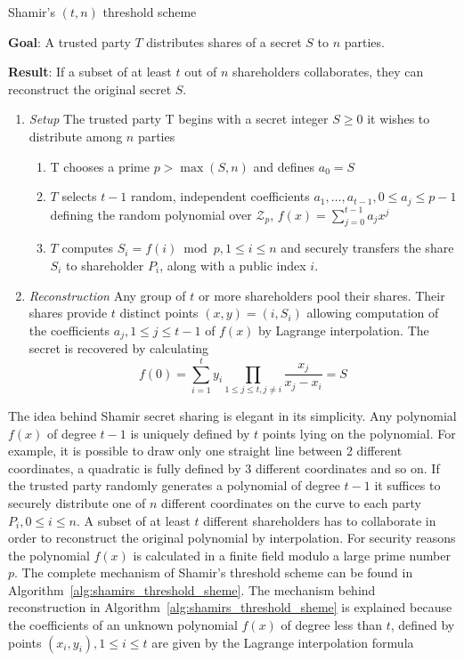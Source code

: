 \begin{algorithm}
\caption{Shamir's $\left( t, n \right)$ threshold scheme~\cite{book:handbook_of_applied_cryptography} }
\label{alg:shamirs_threshold_sheme}
 \textbf{Goal}: A trusted party $T$ distributes shares of a secret $S$ to $n$ parties.
 
 \textbf{Result}: If a subset of at least $t$ out of $n$ shareholders collaborates, they can reconstruct the original secret $S$.
 \begin{enumerate}
  \item \textit{Setup} The trusted party T begins with a secret integer $S \geq 0$ it wishes to distribute among $n$ parties
   \begin{enumerate}
    \item T chooses a prime $p > \max \left( S, n \right)$ and defines $a_0 = S$
    \item $T$ selects $t-1$ random, independent coefficients $a_1, \ldots, a_{t-1}, 0 \leq a_j \leq p-1$ defining the random polynomial over $\mathcal{Z}_p$, $f \left( x \right) = \sum^{t-1}_{j=0} a_j x^j$
    \item $T$ computes $S_i = f \left( i \right) \bmod p, 1 \leq i \leq n$ and securely transfers the share $S_i$ to shareholder $P_i$, along with a public index $i$.
   \end{enumerate}
   \item \textit{Reconstruction} Any group of $t$ or more shareholders pool their shares. Their shares provide $t$ distinct points $\left( x, y \right) = \left( i, S_i \right)$ allowing computation of the coefficients $a_j, 1 \leq j \leq t-1$ of $f \left( x \right)$ by Lagrange interpolation. The secret is recovered by calculating
 \begin{equation*}
  f \left( 0 \right) = \sum^t_{i=1}y_i \prod_{1 \leq j \leq t, j \neq i} \frac{x_j}{x_j-x_i} = S
 \end{equation*}
 \end{enumerate}
\end{algorithm}

The idea behind Shamir secret sharing is elegant in its simplicity. Any polynomial $f \left( x \right)$ of degree $t-1$ is uniquely defined by $t$ points lying on the polynomial. For example, it is possible to draw only one straight line between 2 different coordinates, a quadratic is fully defined by 3 different coordinates and so on. If the trusted party randomly generates a polynomial of degree $t-1$ it suffices to securely distribute one of $n$ different coordinates on the curve to each party $P_i, 0 \leq i \leq n$. A subset of at least $t$ different shareholders has to collaborate in order to reconstruct the original polynomial by interpolation. For security reasons the polynomial $f \left( x \right)$ is calculated in a finite field modulo a large prime number $p$. The complete mechanism of Shamir's threshold scheme can be found in Algorithm~\ref{alg:shamirs_threshold_sheme}. The mechanism behind reconstruction in Algorithm~\ref{alg:shamirs_threshold_sheme} is explained because the coefficients of an unknown polynomial $f \left( x \right)$ of degree less than $t$, defined by points $\left( x_i, y_i \right), 1 \leq i \leq t$ are given by the Lagrange interpolation formula


